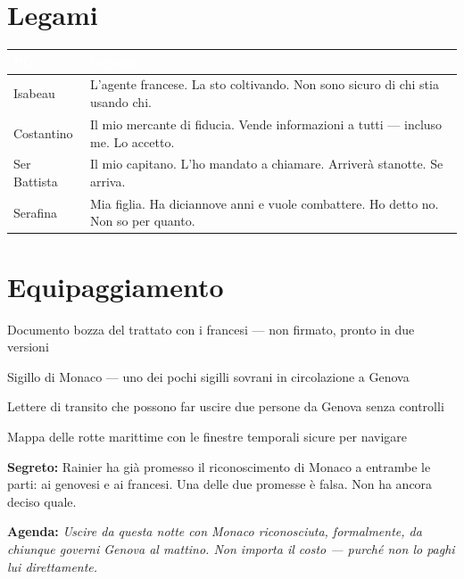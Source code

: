\section*{Legami}
\begin{table}[h]\centering\renewcommand{\arraystretch}{1.4}
\begin{tabularx}{\linewidth}{@{}L{2.6cm} X@{}}
\toprule{}
\textcolor{white}{\textbf{PG}} & \textcolor{white}{\textbf{Legame}} \\
\midrule
Isabeau & L'agente francese. La sto coltivando. Non sono sicuro di chi stia usando chi. \\
Costantino & Il mio mercante di fiducia. Vende informazioni a tutti --- incluso me. Lo accetto. \\
Ser Battista & Il mio capitano. L'ho mandato a chiamare. Arriver\`a stanotte. Se arriva. \\
Serafina & Mia figlia. Ha diciannove anni e vuole combattere. Ho detto no. Non so per quanto. \\
\bottomrule
\end{tabularx}
\end{table}

\section*{Equipaggiamento}
\begin{goldlist}
\item Documento bozza del trattato con i francesi --- non firmato, pronto in due versioni
\item Sigillo di Monaco --- uno dei pochi sigilli sovrani in circolazione a Genova
\item Lettere di transito che possono far uscire due persone da Genova senza controlli
\item Mappa delle rotte marittime con le finestre temporali sicure per navigare
\end{goldlist}

\clearpage
\begin{secretbox}
\textbf{Segreto:} Rainier ha gi\`a promesso il riconoscimento di Monaco a entrambe le parti: ai genovesi e ai francesi. Una delle due promesse \`e falsa. Non ha ancora deciso quale.

\medskip\noindent\textcolor{SecretRed}{\textbf{Agenda:}} \textit{Uscire da questa notte con Monaco riconosciuta, formalmente, da chiunque governi Genova al mattino. Non importa il costo --- purch\'e non lo paghi lui direttamente.}
\end{secretbox}

